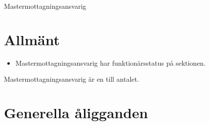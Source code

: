 \documentclass[a4paper]{article}
\begin{document}
\renewcommand{\forening}{Mastermottagningsansvarig} %

\begin{foreningenv}{\forening{}} %

    \section{Allmänt}
    \begin{itemize}
        \item Mastermottagningsansvarig har funktionärsstatus på sektionen.
    \end{itemize}
    Mastermottagningsansvarig är en till antalet.
    
    \section{Generella åligganden}
    \aliggsektfunkt{}

\end{foreningenv}
\end{document}
